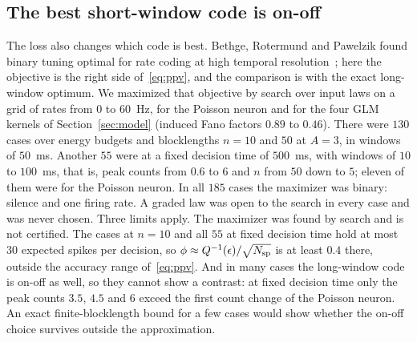 \documentclass[journal]{IEEEtran}
\begin{document}
\subsection{The best short-window code is on-off}
The loss also changes which code is best. Bethge, Rotermund and Pawelzik found binary tuning optimal for rate coding at high temporal
resolution~\cite{Bethge2003}; here the objective is the right side of~\eqref{eq:ppv}, and the comparison is with the exact long-window
optimum. We maximized that objective by search over input laws on a grid of rates from $0$ to $60$~Hz, for the Poisson neuron and for
the four GLM kernels of Section~\ref{sec:model} (induced Fano factors $0.89$ to $0.46$). There were $130$ cases over energy budgets and
blocklengths $n = 10$ and $50$ at $A = 3$, in windows of $50$~ms. Another $55$ were at a fixed decision time of $500$~ms, with windows of $10$ to
$100$~ms, that is, peak counts from $0.6$ to $6$ and $n$ from $50$ down to $5$; eleven of them were for the Poisson neuron. In all $185$
cases the maximizer was binary: silence and one firing rate. A graded law was open to the search in every case and was never chosen.
Three limits apply. The maximizer was found by search and is not certified. The cases at $n = 10$ and all $55$ at fixed decision time
hold at most $30$ expected spikes per decision, so $\phi \approx Q^{-1}(\epsilon)/\sqrt{N_{\rm sp}}$ is at least $0.4$ there, outside
the accuracy range of~\eqref{eq:ppv}. And in many cases
the long-window code is on-off as well, so they cannot show a contrast: at fixed decision time only the peak counts $3.5$, $4.5$ and $6$
exceed the first count change of the Poisson neuron. An exact finite-blocklength bound for a few cases would show whether the on-off
choice survives outside the approximation.
\end{document}
